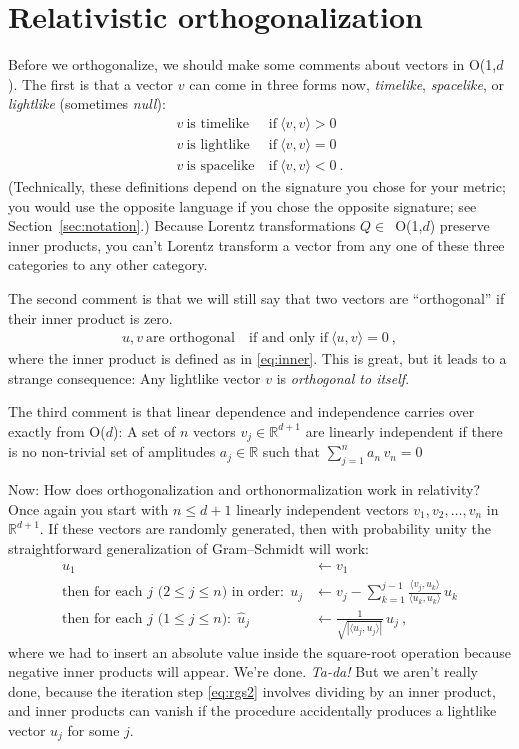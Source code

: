 \documentclass{article}
\newcommand{\inner}[2]{\langle{#1},{#2}\rangle}
\newcommand{\secref}[1]{Section~\ref{#1}}
\begin{document}
\section{Relativistic orthogonalization}\label{sec:orth}

Before we orthogonalize, we should make some comments about vectors in O(1,$d$).
The first is that a vector $v$ can come in three forms now, \emph{timelike}, \emph{spacelike}, or \emph{lightlike} (sometimes \emph{null}):
\begin{align}
    v ~ \mbox{is timelike} &~ \mbox{if} ~ \inner{v}{v} > 0 \\
    v ~ \mbox{is lightlike} &~ \mbox{if} ~ \inner{v}{v} = 0 \\
    v ~ \mbox{is spacelike} &~ \mbox{if} ~ \inner{v}{v} < 0 ~.
\end{align}
(Technically, these definitions depend on the signature you chose for your metric; you would use the opposite language if you chose the opposite signature; see \secref{sec:notation}.)
Because Lorentz transformations $Q\in$~O(1,$d$) preserve inner products, you can't Lorentz transform a vector from any one of these three categories to any other category.

The second comment is that we will still say that two vectors are ``orthogonal'' if their inner product is zero.
\begin{align}
    u,v ~\mbox{are orthogonal} ~ &\mbox{if and only if} ~ \inner{u}{v}=0 ~,
\end{align}
where the inner product is defined as in \eqref{eq:inner}.
This is great, but it leads to a strange consequence:
Any lightlike vector $v$ is \emph{orthogonal to itself}.

The third comment is that linear dependence and independence carries over exactly from O($d$):
A set of $n$ vectors $v_j\in\mathbb{R}^{d+1}$ are linearly independent if there is no non-trivial set of amplitudes $a_j\in\mathbb{R}$ such that $\sum_{j=1}^n a_n\,v_n = 0$

Now: How does orthogonalization and orthonormalization work in relativity?
Once again you start with $n\leq d+1$ linearly independent vectors $v_1,v_2,\ldots,v_n$ in $\mathbb{R}^{d+1}$.
If these vectors are randomly generated, then with probability unity the straightforward generalization of Gram--Schmidt will work:
\begin{align}
    u_1 &\leftarrow v_1 \label{eq:rgs1}
    \\
    \mbox{then for each $j$ ($2\leq j\leq n$) in order:} ~~ u_j &\leftarrow v_j - \sum_{k=1}^{j-1} \frac{\inner{v_j}{u_k}}{\inner{u_k}{u_k}}\,u_k \label{eq:rgs2}
    \\
    \mbox{then for each $j$ ($1\leq j\leq n$):} ~~ \hat{u}_j &\leftarrow \frac{1}{\sqrt{|\inner{u_j}{u_j}|}}\,u_j ~, \label{eq:rgs3}
\end{align}
where we had to insert an absolute value inside the square-root operation because negative inner products will appear.
We're done. \emph{Ta-da!}
But we aren't really done, because the iteration step \eqref{eq:rgs2} involves dividing by an inner product, and inner products can vanish if the procedure accidentally produces a lightlike vector $u_j$ for some $j$.
\end{document}
